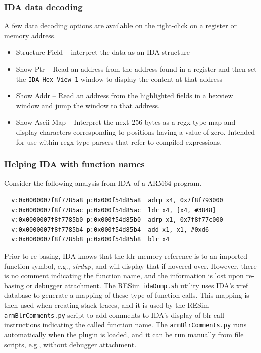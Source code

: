\documentclass[titlepage]{article}
\begin{document}
\subsubsection{IDA data decoding}
A few data decoding options are available on the right-click on a register or memory address.
\begin{itemize}
\item Structure Field -- interpret the data as an IDA structure
\item Show Ptr -- Read an address from the address found in a register and then set the {\tt IDA Hex View-1} window to display the content at that address
\item Show Addr -- Read an address from the highlighted fields in a hexview window and jump the window to that address.
\item Show Ascii Map -- Interpret the next 256 bytes as a regx-type map and display characters corresponding to positions having a value of zero.  Intended
for use within regx type parsers that refer to compiled expressions.
\end{itemize}

\subsubsection{Helping IDA with function names}
Consider the following analysis from IDA of a ARM64 program.
\begin{verbatim}
  v:0x0000007f8f7785a8 p:0x000f54d85a8  adrp x4, 0x7f8f793000
  v:0x0000007f8f7785ac p:0x000f54d85ac  ldr x4, [x4, #3848]
  v:0x0000007f8f7785b0 p:0x000f54d85b0  adrp x1, 0x7f8f77c000
  v:0x0000007f8f7785b4 p:0x000f54d85b4  add x1, x1, #0xd6
  v:0x0000007f8f7785b8 p:0x000f54d85b8  blr x4
\end{verbatim}

Prior to re-basing, IDA knows that the ldr memory reference is to an imported function symbol, e.g., \textit{strdup}, and
will display that if hovered over.  However, there is no comment indicating the function name, and the information is lost
upon re-basing or debugger attachment. 
The RESim {\tt idaDump.sh} utility uses IDA's xref database to generate a mapping of these type of function calls.
This mapping is then used when creating stack traces, and it is used by the RESim {\tt armBlrComments.py} script to add comments
to IDA's display of blr call instructions indicating the called function name.  The {\tt armBlrComments.py} runs automatically when the
plugin is loaded, and it can be run manually from file scripts, e.g., without debugger attachment.
\end{document}

